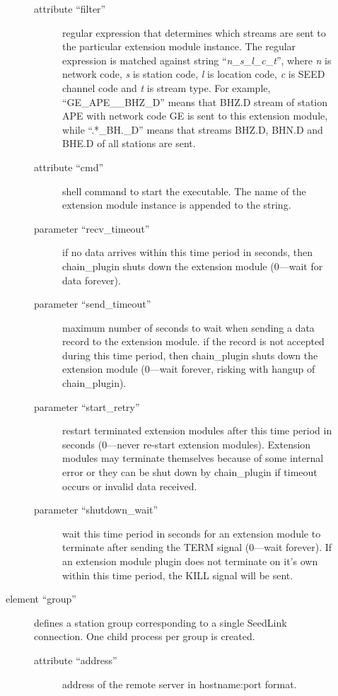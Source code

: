 \documentclass[11pt,a4paper,titlepage]{article}
\begin{document}
\begin{description}
\begin{description}
\begin{description}
\item[attribute ``filter''] regular expression that determines which
streams are sent to the particular extension module instance. The regular
expression is matched against string
``\emph{n}\_\emph{s}\_\emph{l}\_\emph{c}\_\emph{t}'', where \emph{n} is
network code, \emph{s} is station code, \emph{l} is location code, \emph{c}
is SEED channel code and \emph{t} is stream type. For example,
``GE\_APE\_\_BHZ\_D'' means that BHZ.D stream of station APE with network
code GE is sent to this extension module, while ``.*\_BH.\_D'' means that
streams BHZ.D, BHN.D and BHE.D of all stations are sent.

\item[attribute ``cmd''] shell command to start the executable. The name of
the extension module instance is appended to the string.

\item[parameter ``recv\_timeout'' ] if no data arrives within this
time period in seconds, then chain\_plugin shuts down the extension module
(0---wait for data forever).

\item[parameter ``send\_timeout'' ] maximum number of seconds to
wait when sending a data record to the extension module. if the record is
not accepted during this time period, then chain\_plugin shuts down the
extension module (0---wait forever, risking with hangup of chain\_plugin).

\item[parameter ``start\_retry''] restart terminated extension modules
after this time period in seconds (0---never re-start extension modules).
Extension modules may terminate themselves because of some internal error
or they can be shut down by chain\_plugin if timeout occurs or invalid data
received.

\item[parameter ``shutdown\_wait''] wait this time period in seconds for an
extension module to terminate after sending the TERM signal (0---wait
forever). If an extension module plugin does not terminate on it's own
within this time period, the KILL signal will be sent.
\end{description}

\item[element ``group''] defines a station group corresponding to a single
SeedLink connection. One child process per group is created.

\begin{description}
\item[attribute ``address''] address of the remote server in hostname:port
format.


\end{description}
\end{description}
\end{description}
\end{document}
